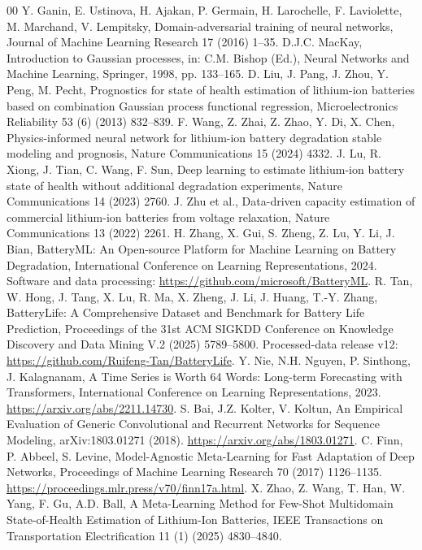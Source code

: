 \begin{thebibliography}{00}
 Y. Ganin, E. Ustinova, H. Ajakan, P. Germain, H. Larochelle, F. Laviolette, M. Marchand, V. Lempitsky, Domain-adversarial training of neural networks, Journal of Machine Learning Research 17 (2016) 1--35.
 D.J.C. MacKay, Introduction to Gaussian processes, in: C.M. Bishop (Ed.), Neural Networks and Machine Learning, Springer, 1998, pp. 133--165.
 D. Liu, J. Pang, J. Zhou, Y. Peng, M. Pecht, Prognostics for state of health estimation of lithium-ion batteries based on combination Gaussian process functional regression, Microelectronics Reliability 53 (6) (2013) 832--839.
 F. Wang, Z. Zhai, Z. Zhao, Y. Di, X. Chen, Physics-informed neural network for lithium-ion battery degradation stable modeling and prognosis, Nature Communications 15 (2024) 4332.
 J. Lu, R. Xiong, J. Tian, C. Wang, F. Sun, Deep learning to estimate lithium-ion battery state of health without additional degradation experiments, Nature Communications 14 (2023) 2760.
 J. Zhu et al., Data-driven capacity estimation of commercial lithium-ion batteries from voltage relaxation, Nature Communications 13 (2022) 2261.
 H. Zhang, X. Gui, S. Zheng, Z. Lu, Y. Li, J. Bian, BatteryML: An Open-source Platform for Machine Learning on Battery Degradation, International Conference on Learning Representations, 2024. Software and data processing: \url{https://github.com/microsoft/BatteryML}.
 R. Tan, W. Hong, J. Tang, X. Lu, R. Ma, X. Zheng, J. Li, J. Huang, T.-Y. Zhang, BatteryLife: A Comprehensive Dataset and Benchmark for Battery Life Prediction, Proceedings of the 31st ACM SIGKDD Conference on Knowledge Discovery and Data Mining V.2 (2025) 5789--5800. Processed-data release v12: \url{https://github.com/Ruifeng-Tan/BatteryLife}.
 Y. Nie, N.H. Nguyen, P. Sinthong, J. Kalagnanam, A Time Series is Worth 64 Words: Long-term Forecasting with Transformers, International Conference on Learning Representations, 2023. \url{https://arxiv.org/abs/2211.14730}.
 S. Bai, J.Z. Kolter, V. Koltun, An Empirical Evaluation of Generic Convolutional and Recurrent Networks for Sequence Modeling, arXiv:1803.01271 (2018). \url{https://arxiv.org/abs/1803.01271}.
 C. Finn, P. Abbeel, S. Levine, Model-Agnostic Meta-Learning for Fast Adaptation of Deep Networks, Proceedings of Machine Learning Research 70 (2017) 1126--1135. \url{https://proceedings.mlr.press/v70/finn17a.html}.
 X. Zhao, Z. Wang, T. Han, W. Yang, F. Gu, A.D. Ball, A Meta-Learning Method for Few-Shot Multidomain State-of-Health Estimation of Lithium-Ion Batteries, IEEE Transactions on Transportation Electrification 11 (1) (2025) 4830--4840.

\end{thebibliography}
